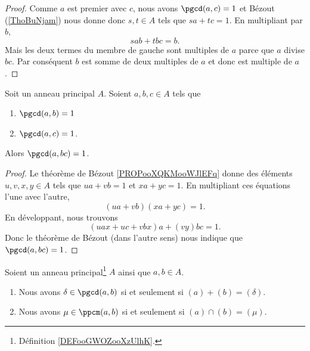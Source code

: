 \begin{proof}
	Comme \( a\) est premier avec \( c\), nous avons \( \pgcd(a,c)=1\) et Bézout (\ref{ThoBuNjam}) nous donne donc \( s,t\in A\) tels que \( sa+tc=1\). En multipliant par \( b\),
	\begin{equation}
		sab+tbc=b.
	\end{equation}
	Mais les deux termes du membre de gauche sont multiples de \( a\) parce que \( a\) divise \( bc\). Par conséquent \( b\) est somme de deux multiples de \( a\) et donc est multiple de \( a\).
\end{proof}

\begin{lemma}		\label{LEMooQJGIooEtVnyj}
	Soit un anneau principal \( A\). Soient \( a,b,c\in A\) tels que
	\begin{enumerate}
		\item
		      \( \pgcd(a,b)=1\)
		\item
		      \( \pgcd(a,c)=1\).
	\end{enumerate}
	Alors \( \pgcd(a,bc)=1\).
\end{lemma}

\begin{proof}
	Le théorème de Bézout \ref{PROPooXQKMooWJlEFq} donne des éléments \( u,v,x,y\in A\) tels que \( ua+vb=1\) et \( xa+yc=1\). En multipliant ces équations l'une avec l'autre,
	\begin{equation}
		(ua+vb)(xa+yc)=1.
	\end{equation}
	En développant, nous trouvons
	\begin{equation}
		(uax+uc+vbx)a+(vy)bc=1.
	\end{equation}
	Donc le théorème de Bézout (dans l'autre sens) nous indique que \( \pgcd(a,bc)=1\).
\end{proof}


\begin{proposition}	\label{PROPooYTMYooEYxuQc}
	Soient un anneau principal\footnote{Définition \ref{DEFooGWOZooXzUlhK}.} \( A\) ainsi que \( a,b\in A\).
	\begin{enumerate}
		\item
		      Nous avons \( \delta\in \pgcd(a,b)\) si et seulement si \( (a)+(b)=(\delta)\).
		\item
		      Nous avons \( \mu\in\ppcm(a,b)\) si et seulement si \( (a)\cap (b)=(\mu)\).
	\end{enumerate}
\end{proposition}

